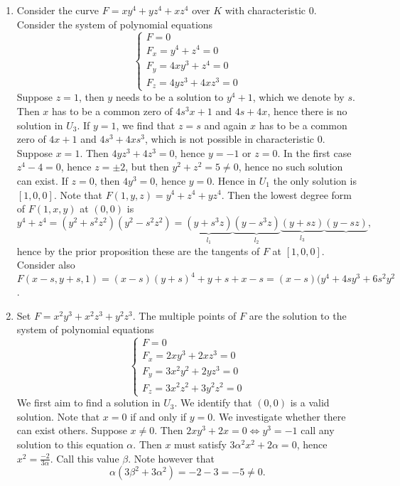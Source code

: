     \begin{example}
        \begin{enumerate}
            \item Consider the curve $F= xy^4+yz^4+xz^4$ over $K$ with characteristic $0$. Consider the system of polynomial equations 
            $$\begin{cases}
                F = 0\\
                F_x = y^4+z^4=0\\
                F_y = 4xy^3+z^4=0\\
                F_z = 4yz^3+4xz^3=0
            \end{cases}$$
             Suppose $z=1$, then $y$ needs to be a solution to $y^4 + 1$, which we denote by $s$. Then $x$ has to be a common zero of $4s^3x+1$ and $4s+4x$, hence there is no solution in $U_3$. If $y=1$, we find that $z=s$ and again $x$ has to be a common zero of $4x+1$ and $4s^3+4xs^3$, which is not possible in characteristic $0$. Suppose $x=1$. Then $4yz^3+4z^3=0$, hence $y=-1$ or $z=0$. In the first case $z^4-4=0$, hence $z=\pm 2$, but then $y^2+z^2=5\neq 0$, hence no such solution can exist. If $z=0$, then $4y^3=0$, hence $y=0$. Hence in $U_1$ the only solution is $[1,0,0]$. Note that $F(1,y,z)= y^4+z^4+yz^4$. Then the lowest degree form of $F(1,x,y)$ at $(0,0)$ is $$y^4+z^4=(y^2+s^2z^2)(y^2-s^2z^2)=\underbrace{(y+s^3z)}_{l_1}\underbrace{(y-s^3z)}_{l_2}\underbrace{(y+sz)}_{l_3}\underbrace{(y-sz)},$$
             hence by the prior proposition these are the tangents of $F$ at $[1,0,0]$. Consider also $F(x-s,y+s,1)=(x-s)(y+s)^4+y+s+x-s=(x-s)(y^4+4sy^3+6s^2y^2$.
             \item Set $F=x^2y^3+x^2z^3+y^2z^3$. The multiple points of $F$ are the solution to the system of polynomial equations 
             $$\begin{cases}
                F = 0\\
                F_x = 2xy^3+2xz^3 = 0\\
                F_y = 3x^2y^2+2yz^3 = 0\\
                F_z = 3x^2z^2+3y^2z^2 = 0
             \end{cases}$$
             We first aim to find a solution in $U_3$. We identify that $(0,0)$ is a valid solution. Note that $x=0$ if and only if $y=0$.  We investigate whether there can exist others. Suppose $x\neq 0$. Then $2xy^3+2x=0\iff y^3=-1$ call any solution to this equation $\alpha$. Then $x$ must satisfy $3\alpha^2x^2+2\alpha=0$, hence $ x^2 =\frac{-2}{3\alpha}$. Call this value $\beta$. Note however that $$\alpha(3\beta^2 +3\alpha^2) = -2-3=-5\neq 0.$$

\end{enumerate}
\end{example}
